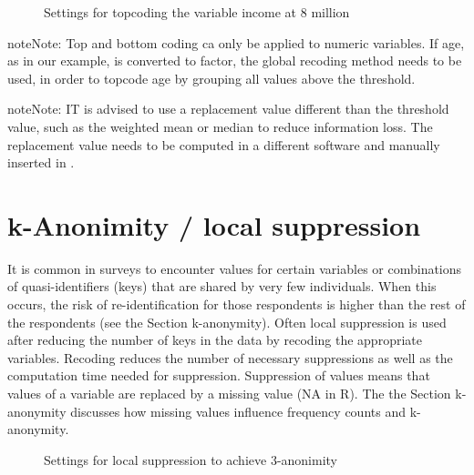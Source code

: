 \documentclass[letterpaper,10pt,english]{sphinxmanual}
\begin{document}
\begin{figure}[htbp]
\centering
\capstart

\noindent{}
\caption{Settings for topcoding the variable income at 8 million}\label{\detokenize{anon:fig82}}\label{\detokenize{anon:id2}}\end{figure}

\begin{sphinxadmonition}{note}{Note:}
Top and bottom coding ca only be applied to numeric variables. If age, as in our example,
is converted to factor, the global recoding method needs to be used, in order to
topcode age by grouping all values above the threshold.
\end{sphinxadmonition}

\begin{sphinxadmonition}{note}{Note:}
IT is advised to use a replacement value different than the threshold value,
such as the weighted mean or median to reduce information loss. The replacement
value needs to be computed in a different software and manually inserted in .
\end{sphinxadmonition}


\section{k-Anonimity / local suppression}
\label{\detokenize{anon:k-anonimity-local-suppression}}
It is common in surveys to encounter values for certain variables or combinations
of quasi-identifiers (keys) that are shared by very few individuals. When this occurs,
the risk of re-identification for those respondents is higher than the rest of the
respondents (see the Section k-anonymity). Often local suppression is used after
reducing the number of keys in the data by recoding the appropriate variables.
Recoding reduces the number of necessary suppressions as well as the computation
time needed for suppression. Suppression of values means that values of a variable
are replaced by a missing value (NA in R). The the Section k-anonymity discusses how
missing values influence frequency counts and k-anonymity.

\begin{figure}[htbp]
\centering
\capstart

\noindent{}
\caption{Settings for local suppression to achieve 3-anonimity}\label{\detokenize{anon:fig83}}\label{\detokenize{anon:id3}}\end{figure}
\end{document}
